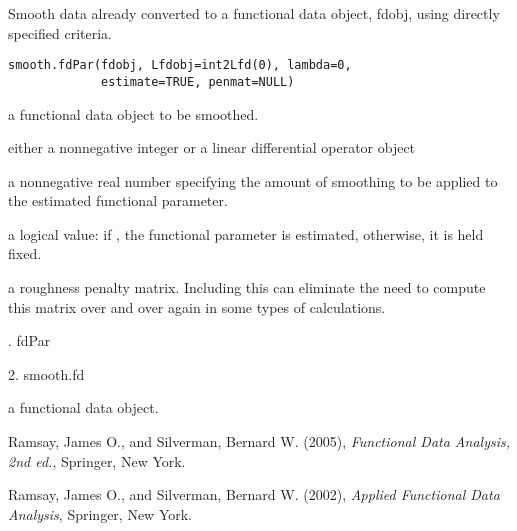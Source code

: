 \documentclass{article}
\begin{document}
\begin{Description}\relax
Smooth data already converted to a functional data object, fdobj,
using directly specified criteria.
\end{Description}
\begin{Usage}
\begin{verbatim}
smooth.fdPar(fdobj, Lfdobj=int2Lfd(0), lambda=0,
             estimate=TRUE, penmat=NULL) 
\end{verbatim}
\end{Usage}
\begin{Arguments}
\begin{ldescription}
\item[\code{fdobj}] a functional data object to be smoothed.    

\item[\code{Lfdobj}] either a nonnegative integer or a linear differential operator
object 

\item[\code{lambda}] a nonnegative real number specifying the amount of smoothing
to be applied to the estimated functional parameter.

\item[\code{estimate}] a logical value:  if , the functional parameter is
estimated, otherwise, it is held fixed.

\item[\code{penmat}] a roughness penalty matrix.  Including this can eliminate the need
to compute this matrix over and over again in some types of
calculations.

\end{ldescription}
\end{Arguments}
\begin{Details}.  fdPar

2.  smooth.fd
\end{Details}
\begin{Value}
a functional data object.
\end{Value}
\begin{References}\relax
Ramsay, James O., and Silverman, Bernard W. (2005), \emph{Functional 
Data Analysis, 2nd ed.}, Springer, New York. 

Ramsay, James O., and Silverman, Bernard W. (2002), \emph{Applied
Functional Data Analysis}, Springer, New York.
\end{References}
\end{document}

